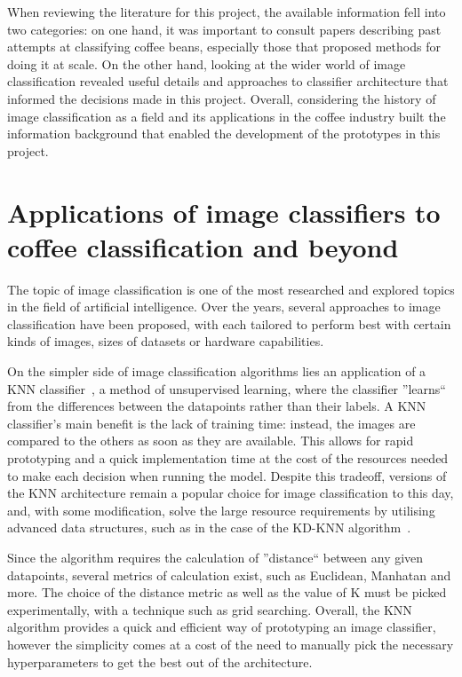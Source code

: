 When reviewing the literature for this project, the available information fell into
two categories: on one hand, it was important to consult papers describing past attempts
at classifying coffee beans, especially those that proposed methods for doing it
at scale.
On the other hand, looking at the wider world of image classification
revealed useful details and approaches to classifier architecture that informed
the decisions made in this project.
Overall, considering the history of image
classification as a field and its applications in the coffee industry built the
information background that enabled the development of the prototypes in this
project.

\section{Applications of image classifiers to coffee classification and beyond}
\label{sec:lit-review-general} The topic of image classification is one of the
most researched and explored topics in the field of artificial intelligence.
Over
the years, several approaches to image classification have been proposed, with each
tailored to perform best with certain kinds of images, sizes of datasets or
hardware capabilities.

On the simpler side of image classification algorithms lies an application of a %
KNN classifier~\cite{knnOverview}, a method of unsupervised learning, where the
classifier ''learns`` from the differences between the datapoints rather than
their labels.
A KNN classifier's main benefit is the lack of training time:
instead, the images are compared to the others as soon as they are available.
This allows for rapid prototyping and a quick implementation time at the cost of
the resources needed to make each decision when running the model.
Despite this tradeoff,
versions of the KNN architecture remain a popular choice for image
classification to this day, and, with some modification, solve the large resource
requirements by utilising advanced data structures, such as in the case of the
KD-KNN algorithm~\cite{kdtreeKNN}.

Since the algorithm requires the calculation of ''distance`` between any given
datapoints, several metrics of calculation exist, such as Euclidean, Manhatan and
more.
The choice of the distance metric as well as the value of K must be picked
experimentally, with a technique such as grid searching.
Overall, the KNN algorithm
provides a quick and efficient way of prototyping an image classifier, however
the simplicity comes at a cost of the need to manually pick the necessary
hyperparameters to get the best out of the architecture. %

